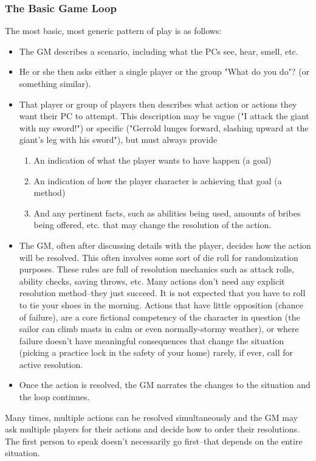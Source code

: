 \subsubsection{The Basic Game Loop}
The most basic, most generic pattern of play is as follows:
\begin{itemize}
    \item The GM describes a scenario, including what the PCs see, hear, smell, etc.
    \item He or she then asks either a single player or the group "What do you do"? (or something similar).
    \item That player or group of players then describes what action or actions they want their PC to attempt. This description may be vague ("I attack the giant with my sword!") or specific ("Gerrold lunges forward, slashing upward at the giant's leg with his sword"), but must always provide
    \begin{enumerate}
        \item An indication of what the player wants to have happen (a goal)
        \item An indication of how the player character is achieving that goal (a method)
        \item And any pertinent facts, such as abilities being used, amounts of bribes being offered, etc. that may change the resolution of the action.
    \end{enumerate}
    \item The GM, often after discussing details with the player, decides how the action will be resolved. This often involves some sort of die roll for randomization purposes. These rules are full of resolution mechanics such as attack rolls, ability checks, saving throws, etc. Many actions don't need any explicit resolution method--they just succeed. It is not expected that you have to roll to tie your shoes in the morning. Actions that have little opposition (chance of failure), are a core fictional competency of the character in question (the sailor can climb masts in calm or even normally-stormy weather), or where failure doesn't have meaningful consequences that change the situation (picking a practice lock in the safety of your home) rarely, if ever, call for active resolution.
    \item Once the action is resolved, the GM narrates the changes to the situation and the loop continues.
\end{itemize}

Many times, multiple actions can be resolved simultaneously and the GM may ask multiple players for their actions and decide how to order their resolutions. The first person to speak doesn't necessarily go first--that depends on the entire situation.

